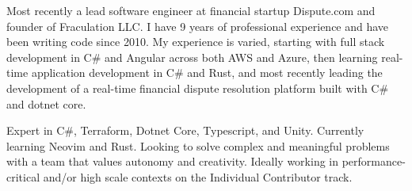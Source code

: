 

\begin{cvparagraph}

Most recently a lead software engineer at financial startup Dispute.com and founder of Fraculation LLC.\@
I have 9 years of professional experience and have been writing code since 2010. My experience is varied, starting with 
full stack development in C\# and Angular across both AWS and Azure, then learning real-time application development in C\# and Rust,
and most recently leading the development of a real-time financial dispute resolution platform built with C\# and dotnet core.

Expert in C\#, Terraform, Dotnet Core, Typescript, and Unity. Currently learning Neovim and Rust. 
Looking to solve complex and meaningful problems with a team that values autonomy and creativity.
Ideally working in performance-critical and/or high scale contexts on the Individual Contributor track.


\end{cvparagraph}
